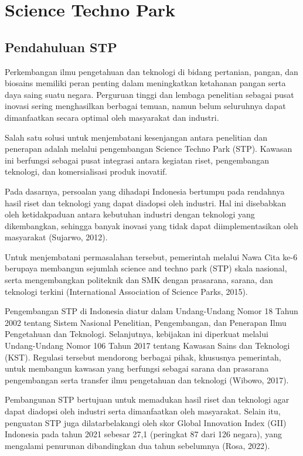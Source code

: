 \documentclass[../wastek.tex]{subfiles}
\begin{document}
\section{Science Techno Park}%
\label{sec:Science Techno Park}

\subsection{Pendahuluan STP}%
\label{sub:Pendahuluan STP}


Perkembangan ilmu pengetahuan dan teknologi di bidang pertanian, pangan, dan biosains memiliki peran penting dalam meningkatkan ketahanan pangan serta daya saing suatu negara. Perguruan tinggi dan lembaga penelitian sebagai pusat inovasi sering menghasilkan berbagai temuan, namun belum seluruhnya dapat dimanfaatkan secara optimal oleh masyarakat dan industri.

Salah satu solusi untuk menjembatani kesenjangan antara penelitian dan penerapan adalah melalui pengembangan Science Techno Park (STP). Kawasan ini berfungsi sebagai pusat integrasi antara kegiatan riset, pengembangan teknologi, dan komersialisasi produk inovatif.

Pada dasarnya, persoalan yang dihadapi Indonesia bertumpu pada rendahnya hasil riset dan teknologi yang dapat diadopsi oleh industri. Hal ini disebabkan oleh ketidakpaduan antara kebutuhan industri dengan teknologi yang dikembangkan, sehingga banyak inovasi yang tidak dapat diimplementasikan oleh masyarakat (Sujarwo, 2012).

Untuk menjembatani permasalahan tersebut, pemerintah melalui Nawa Cita ke-6 berupaya membangun sejumlah science and techno park (STP) skala nasional, serta mengembangkan politeknik dan SMK dengan prasarana, sarana, dan teknologi terkini (International Association of Science Parks, 2015).

Pengembangan STP di Indonesia diatur dalam Undang-Undang Nomor 18 Tahun 2002 tentang Sistem Nasional Penelitian, Pengembangan, dan Penerapan Ilmu Pengetahuan dan Teknologi. Selanjutnya, kebijakan ini diperkuat melalui Undang-Undang Nomor 106 Tahun 2017 tentang Kawasan Sains dan Teknologi (KST). Regulasi tersebut mendorong berbagai pihak, khususnya pemerintah, untuk membangun kawasan yang berfungsi sebagai sarana dan prasarana pengembangan serta transfer ilmu pengetahuan dan teknologi (Wibowo, 2017).

Pembangunan STP bertujuan untuk memadukan hasil riset dan teknologi agar dapat diadopsi oleh industri serta dimanfaatkan oleh masyarakat. Selain itu, penguatan STP juga dilatarbelakangi oleh skor Global Innovation Index (GII) Indonesia pada tahun 2021 sebesar 27,1 (peringkat 87 dari 126 negara), yang mengalami penurunan dibandingkan dua tahun sebelumnya (Rosa, 2022).
\end{document}
